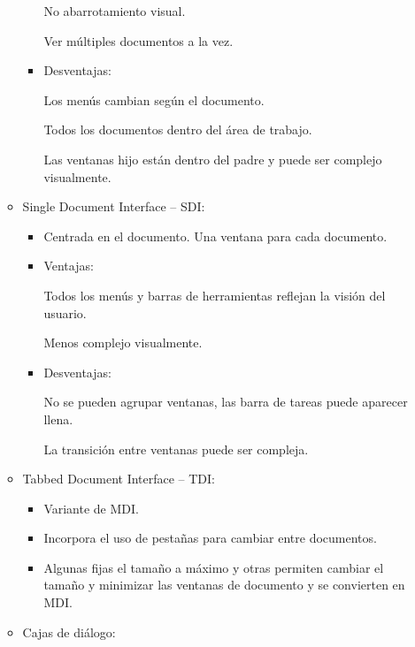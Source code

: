 \documentclass[12pt, twoside, openright]{report} %
\begin{document}
\begin{itemize}
\begin{itemize}
\begin{itemize}
				No abarrotamiento visual.

				Ver múltiples documentos a la vez.

				\item
              Desventajas:

                Los menús cambian según el documento.

				Todos los documentos dentro del área de trabajo.

				Las ventanas hijo están dentro del padre y puede ser
                complejo visualmente.

			\end{itemize}
          \item
            Single Document Interface -- SDI:

            \begin{itemize}
            
            \item
              Centrada en el documento. Una ventana para cada documento.
            \item
              Ventajas:
			  
                Todos los menús y barras de herramientas reflejan la
                visión del usuario.

				Menos complejo visualmente.

				\item
              Desventajas:

                No se pueden agrupar ventanas, las barra de tareas puede
                aparecer llena.

				La transición entre ventanas puede ser compleja.

			\end{itemize}
          \item
            Tabbed Document Interface -- TDI:

            \begin{itemize}
            
            \item
              Variante de MDI.
            \item
              Incorpora el uso de pestañas para cambiar entre
              documentos.
            \item
              Algunas fijas el tamaño a máximo y otras permiten cambiar
              el tamaño y minimizar las ventanas de documento y se
              convierten en MDI.
            \end{itemize}
          \item
            Cajas de diálogo:


\end{itemize}
\end{itemize}
\end{document}
